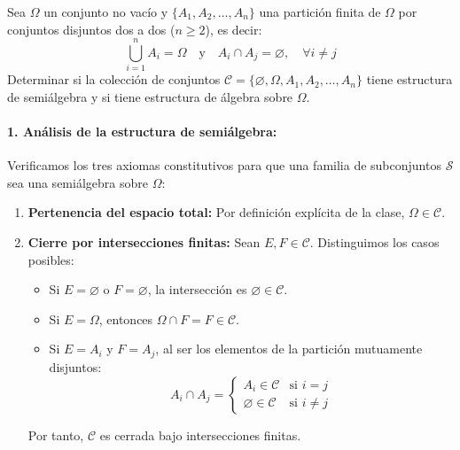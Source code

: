 \newpage
\begin{problema}
Sea $\Omega$ un conjunto no vacío y $\{A_1, A_2, \dots, A_n\}$ una partición finita de $\Omega$ por conjuntos disjuntos dos a dos ($n \ge 2$), es decir:
\[
    \bigcup_{i=1}^n A_i = \Omega \quad \text{y} \quad A_i \cap A_j = \varnothing, \quad \forall i \neq j
\]
Determinar si la colección de conjuntos $\mathcal{C} = \{\varnothing, \Omega, A_1, A_2, \dots, A_n\}$ tiene estructura de semiálgebra y si tiene estructura de álgebra sobre $\Omega$.

\tcblower

\paragraph{1. Análisis de la estructura de semiálgebra:}
Verificamos los tres axiomas constitutivos para que una familia de subconjuntos $\mathcal{S}$ sea una semiálgebra sobre $\Omega$:
\begin{enumerate}[label=\arabic*.]
    \item \textbf{Pertenencia del espacio total:}
    Por definición explícita de la clase, $\Omega \in \mathcal{C}$.

    \item \textbf{Cierre por intersecciones finitas:}
    Sean $E, F \in \mathcal{C}$. Distinguimos los casos posibles:
    \begin{itemize}
        \item Si $E = \varnothing$ o $F = \varnothing$, la intersección es $\varnothing \in \mathcal{C}$.
        \item Si $E = \Omega$, entonces $\Omega \cap F = F \in \mathcal{C}$.
        \item Si $E = A_i$ y $F = A_j$, al ser los elementos de la partición mutuamente disjuntos:
        \[
            A_i \cap A_j = \begin{cases} A_i \in \mathcal{C} & \text{si } i = j \\ \varnothing \in \mathcal{C} & \text{si } i \neq j \end{cases}
        \]
    \end{itemize}
    Por tanto, $\mathcal{C}$ es cerrada bajo intersecciones finitas.


\end{enumerate}
\end{problema}
